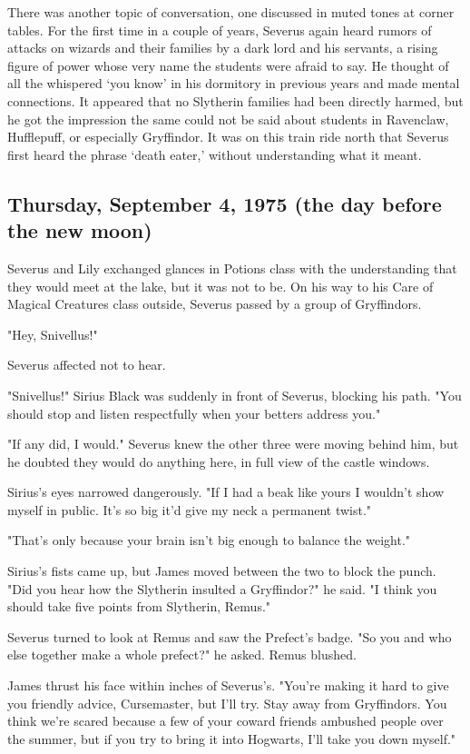\documentclass[a4paper,11pt]{article}
\begin{document}
There was another topic of conversation, one discussed in muted tones at corner tables. For the first time in a couple of years, Severus again heard rumors of attacks on wizards and their families by a dark lord and his servants, a rising figure of power whose very name the students were afraid to say. He thought of all the whispered `you know' in his dormitory in previous years and made mental connections. It appeared that no Slytherin families had been directly harmed, but he got the impression the same could not be said about students in Ravenclaw, Hufflepuff, or especially Gryffindor. It was on this train ride north that Severus first heard the phrase `death eater,' without understanding what it meant.

\subsection{Thursday, September 4, 1975 (the day before the new moon)}

Severus and Lily exchanged glances in Potions class with the understanding that they would meet at the lake, but it was not to be. On his way to his Care of Magical Creatures class outside, Severus passed by a group of Gryffindors.

"Hey, Snivellus!"

Severus affected not to hear.

"Snivellus!" Sirius Black was suddenly in front of Severus, blocking his path. "You should stop and listen respectfully when your betters address you."

"If any did, I would." Severus knew the other three were moving behind him, but he doubted they would do anything here, in full view of the castle windows.

Sirius's eyes narrowed dangerously. "If I had a beak like yours I wouldn't show myself in public. It's so big it'd give my neck a permanent twist."

"That's only because your brain isn't big enough to balance the weight."

Sirius's fists came up, but James moved between the two to block the punch. "Did you hear how the Slytherin insulted a Gryffindor?" he said. "I think you should take five points from Slytherin, Remus."

Severus turned to look at Remus and saw the Prefect's badge. "So you and who else together make a whole prefect?" he asked. Remus blushed.

James thrust his face within inches of Severus's. "You're making it hard to give you friendly advice, Cursemaster, but I'll try. Stay away from Gryffindors. You think we're scared because a few of your coward friends ambushed people over the summer, but if you try to bring it into Hogwarts, I'll take you down myself."
\end{document}
